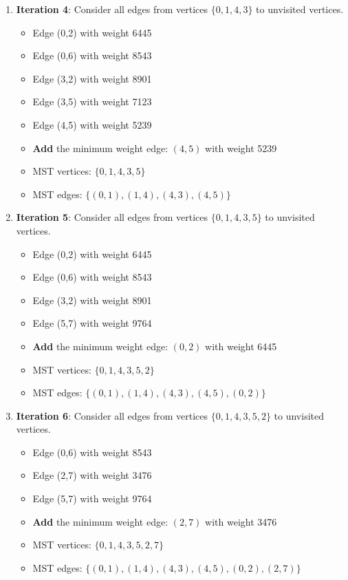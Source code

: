 \documentclass{article}
\theoremstyle{definition}
\begin{document}
\begin{enumerate}
\item \textbf{Iteration 4}: Consider all edges from vertices $\{0,1,4,3\}$ to unvisited vertices.
   \begin{itemize}
   \item Edge (0,2) with weight 6445
   \item Edge (0,6) with weight 8543
   \item Edge (3,2) with weight 8901
   \item Edge (3,5) with weight 7123
   \item Edge (4,5) with weight 5239
   \item \textbf{Add} the minimum weight edge: $(4,5)$ with weight 5239
   \item MST vertices: $\{0,1,4,3,5\}$
   \item MST edges: $\{(0,1), (1,4), (4,3), (4,5)\}$
   \end{itemize}

\item \textbf{Iteration 5}: Consider all edges from vertices $\{0,1,4,3,5\}$ to unvisited vertices.
   \begin{itemize}
   \item Edge (0,2) with weight 6445
   \item Edge (0,6) with weight 8543
   \item Edge (3,2) with weight 8901
   \item Edge (5,7) with weight 9764
   \item \textbf{Add} the minimum weight edge: $(0,2)$ with weight 6445
   \item MST vertices: $\{0,1,4,3,5,2\}$
   \item MST edges: $\{(0,1), (1,4), (4,3), (4,5), (0,2)\}$
   \end{itemize}

\item \textbf{Iteration 6}: Consider all edges from vertices $\{0,1,4,3,5,2\}$ to unvisited vertices.
   \begin{itemize}
   \item Edge (0,6) with weight 8543
   \item Edge (2,7) with weight 3476
   \item Edge (5,7) with weight 9764
   \item \textbf{Add} the minimum weight edge: $(2,7)$ with weight 3476
   \item MST vertices: $\{0,1,4,3,5,2,7\}$
   \item MST edges: $\{(0,1), (1,4), (4,3), (4,5), (0,2), (2,7)\}$
   \end{itemize}


\end{enumerate}
\end{document}
